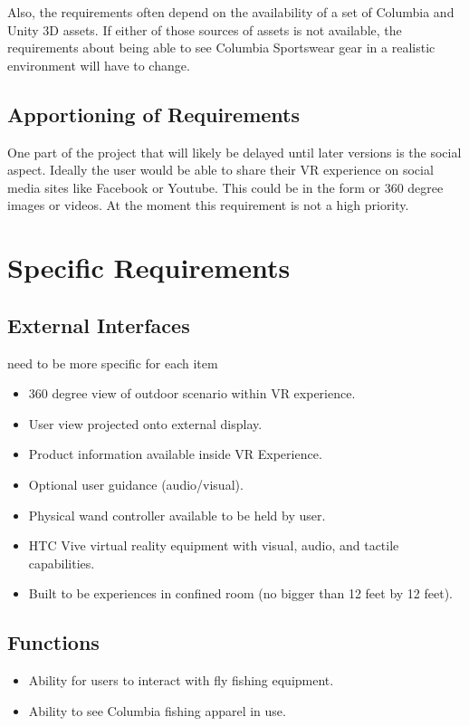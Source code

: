 \documentclass[10pt,journal,compsoc,onecolumn]{IEEEtran}
\begin{document}
Also, the requirements often depend on the availability of a set of Columbia
and Unity 3D assets.  If either of those sources of assets is not available,
the requirements about being able to see Columbia Sportswear gear in a 
realistic environment will have to change.


\subsection{Apportioning of Requirements}
One part of the project that will likely be delayed until later versions is the social aspect.
Ideally the user would be able to share their VR experience on social media sites like Facebook or Youtube.
This could be in the form or 360 degree images or videos.
At the moment this requirement is not a high priority.

\section{Specific Requirements}
\subsection{External Interfaces}
need to be more specific for each item
\begin{itemize}
  \item 360 degree view of outdoor scenario within VR experience.
  \item User view projected onto external display.
  \item Product information available inside VR Experience.
  \item Optional user guidance (audio/visual).
  \item Physical wand controller available to be held by user.
  \item HTC Vive virtual reality equipment with visual, audio, and tactile capabilities.
  \item Built to be experiences in confined room (no bigger than 12 feet by 12 feet).
\end{itemize}

\subsection{Functions}
\begin{itemize}
  \item Ability for users to interact with fly fishing equipment.
  \item Ability to see Columbia fishing apparel in use.
\end{itemize}
\end{document}
